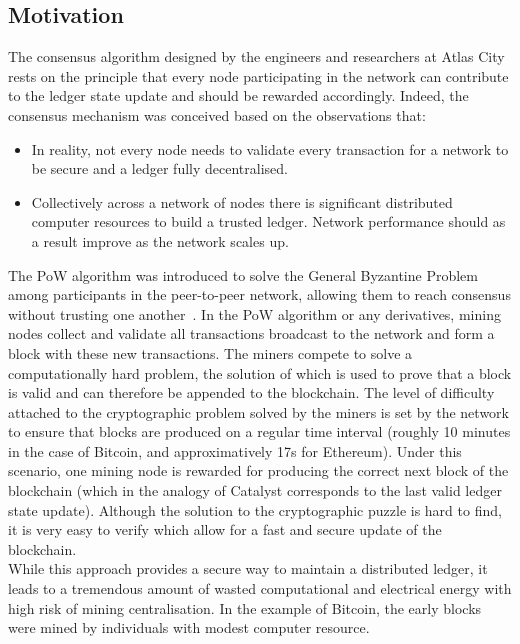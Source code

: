 \subsection{Motivation}
The consensus algorithm designed by the engineers and researchers at Atlas City rests on the principle that every node participating in the network can contribute to the ledger state update and should be rewarded accordingly. Indeed, the consensus mechanism was conceived based on the observations that:  \\

\begin{itemize}
\item In reality, not every node needs to validate every transaction for a network to be secure and a ledger fully decentralised. 
\item Collectively across a network of nodes there is significant distributed computer resources to build a trusted ledger. Network performance should as a result improve as the network scales up.
\end{itemize}

The PoW algorithm was introduced to solve the General Byzantine Problem among participants in the peer-to-peer network, allowing them to reach consensus without trusting one another~\cite{BFT}. In the PoW algorithm or any derivatives, mining nodes collect and validate all transactions broadcast to the network and form a block with these new transactions. The miners compete to solve a computationally hard problem, the solution of which is used to prove that a block is valid and can therefore be appended to the blockchain. The level of difficulty attached to the cryptographic problem solved by the miners is set by the network to ensure that blocks are produced on a regular time interval (roughly 10 minutes in the case of Bitcoin, and approximatively 17s for Ethereum). Under this scenario, one mining node is rewarded for producing the correct next block of the blockchain (which in the analogy of Catalyst corresponds to the last valid ledger state update). Although the solution to the cryptographic puzzle is hard to find, it is very easy to verify which allow for a fast and secure update of the blockchain.  \\

While this approach provides a secure way to maintain a distributed ledger, it leads to a tremendous amount of wasted computational and electrical energy with high risk of mining centralisation. In the example of Bitcoin, the early blocks were mined by individuals with modest computer resource. \\


